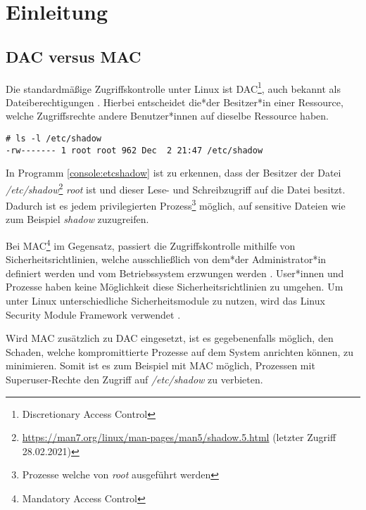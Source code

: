 \section{Einleitung}

\subsection{DAC versus MAC}
\label{lab:dacvsmac}

Die standardmä{\ss}ige Zugriffskontrolle unter Linux ist
DAC\footnote{Discretionary Access Control}, auch bekannt als
Dateiberechtigungen \cite[269]{10.5555/2566728}. Hierbei entscheidet die*der
Besitzer*in einer Ressource, welche Zugriffsrechte andere Benutzer*innen auf dieselbe
Ressource haben.

\begin{lstlisting}[label={console:etcshadow},caption={Dateiberechtigungen von \emph{/etc/shadow}}]
# ls -l /etc/shadow
-rw------- 1 root root 962 Dec  2 21:47 /etc/shadow
\end{lstlisting}

In Programm \ref{console:etcshadow} ist zu erkennen, dass der Besitzer der
Datei
\emph{/etc/shadow}\footnote{\url{https://man7.org/linux/man-pages/man5/shadow.5.html}
(letzter Zugriff 28.02.2021)} \emph{root} ist und dieser Lese- und
Schreibzugriff auf die Datei besitzt. Dadurch ist es jedem privilegierten
Prozess\footnote{Prozesse welche von \emph{root} ausgeführt werden}
möglich, auf sensitive Dateien wie zum Beispiel \emph{shadow} zuzugreifen.

Bei MAC\footnote{Mandatory Access Control} im Gegensatz, passiert die
Zugriffskontrolle mithilfe von Sicherheitsrichtlinien, welche
ausschlie{\ss}lich von dem*der Administrator*in definiert werden und vom Betriebssystem
erzwungen werden \cite[9]{10.5555/2566830}. User*innen und Prozesse haben keine
Möglichkeit diese Sicherheitsrichtlinien zu umgehen. Um unter Linux
unterschiedliche Sicherheitsmodule zu nutzen, wird das Linux Security Module
Framework verwendet \cite{LinuxSecurityModuleFramework}.

Wird MAC zusätzlich zu DAC eingesetzt, ist es gegebenenfalls möglich, den
Schaden, welche kompromittierte Prozesse auf dem System anrichten können, zu
minimieren. Somit ist es zum Beispiel mit MAC möglich, Prozessen mit
Superuser-Rechte den Zugriff auf \emph{/etc/shadow} zu verbieten.

